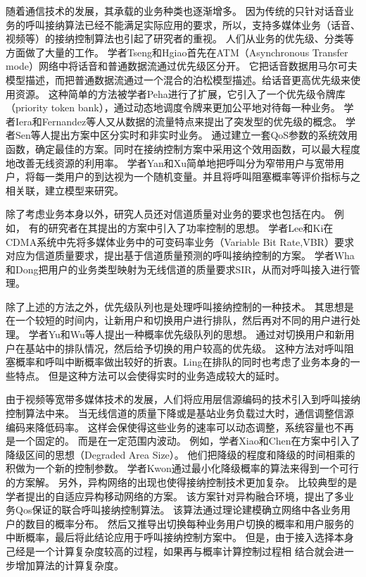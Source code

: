 随着通信技术的发展，其承载的业务种类也逐渐增多。
因为传统的只针对话音业务的呼叫接纳算法已经不能满足实际应用的要求，所以，支持多媒体业务（话音、视频等）的接纳控制算法也引起了研究者的重视。
人们从业务的优先级、分类等方面做了大量的工作。
学者Tseng和Hgiao首先在ATM（Asynchronous Transfer mode）网络中将话音和普通数据流通过优先级区分开。
它把话音数据用马尔可夫模型描述，而把普通数据流通过一个混合的泊松模型描述。给话音更高优先级来使用资源\cite{Tseng:1991}。
这种简单的方法被学者Peha进行了扩展，它引入了一个优先级令牌库（priority token bank），通过动态地调度令牌来更加公平地对待每一种业务\cite{Peha:1993}。
学者Iera和Fernandez等人又从数据的流量特点来提出了突发型的优先级的概念\cite{Iera:1996}\cite{Fernandez:1997}。
学者Sen等人提出方案中区分实时和非实时业务。
通过建立一套QoS参数的系统效用函数，确定最佳的方案。同时在接纳控制方案中采用这个效用函数，可以最大程度地改善无线资源的利用率\cite{Sen:1998}。
学者Yan和Xu简单地把呼叫分为窄带用户与宽带用户，将每一类用户的到达视为一个随机变量。并且将呼叫阻塞概率等评价指标与之相关联，建立模型来研究\cite{Yan:2008}\cite{Xu:2007}。

除了考虑业务本身以外，研究人员还对信道质量对业务的要求也包括在内。 例如，
有的研究者在其提出的方案中引入了功率控制的思想\cite{LiuZhang:2002}\cite{ZhangFang:2006}。
学者Lee和Ki在CDMA系统中先将多媒体业务中的可变码率业务（Variable Bit
Rate,VBR）要求对应为信道质量要求，提出基于信道质量预测的呼叫接纳控制的方案\cite{Lee:2004}。
学者Wha和Dong把用户的业务类型映射为无线信道的质量要求SIR，从而对呼叫接入进行管理\cite{JeonJeong:2001}\cite{Wha:2002}。

除了上述的方法之外，优先级队列也是处理呼叫接纳控制的一种技术。
其思想是在一个较短的时间内，让新用户和切换用户进行排队，然后再对不同的用户进行处理。
学者Yu和Wu等人提出一种概率优先级队列的思想。
通过对切换用户和新用户在基站中的排队情况，然后给予切换的用户较高的优先级。
这种方法对呼叫阻塞概率和呼叫中断概率做出较好的折衷\cite{Yu:2006}。Ling在排队的同时也考虑了业务本身的一些特点\cite{Ling:2009}。
但是这种方法可以会使得实时的业务造成较大的延时。


由于视频等宽带多媒体技术的发展，人们将应用层信源编码的技术引入到呼叫接纳控制算法中来。
当无线信道的质量下降或是基站业务负载过大时，通信调整信源编码来降低码率。
这样会保使得这些业务的速率可以动态调整，系统容量也不再是一个固定的。
而是在一定范围内波动。
例如，学者Xiao和Chen在方案中引入了降级区间的思想（Degraded Area Size）\cite{XiaoChen:2000}。
他们把降级的程度和降级的时间相乘的积做为一个新的控制参数。
学者Kwon通过最小化降级概率的算法来得到一个可行的方案解\cite{KwonChoi:1999}。
另外，异构网络的出现也使得接纳控制技术更加复杂。
比较典型的是学者提出的自适应异构移动网络的方案\cite{LiChao:2007}。
该方案针对异构融合环境，提出了多业务Qos保证的联合呼叫接纳控制算法。
该算法通过理论建模确立网络中各业务用户的数目的概率分布。
然后又推导出切换每种业务用户切换的概率和用户服务的中断概率，最后将此结论应用于呼叫接纳控制方案中。 但是，由于接入选择本身己经是一个计算复杂度较高的过程，如果再与概率计算控制过程相
结合就会进一步增加算法的计算复杂度。


